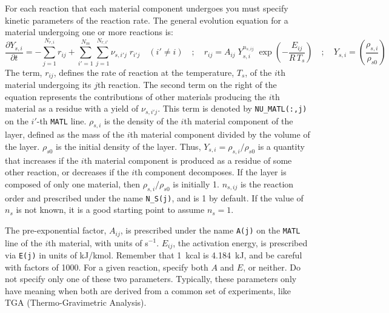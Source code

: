 \documentclass[11pt]{book}
\newcommand{\ct}{\tt\small}
\newcommand{\dod}[2]{\frac{\partial #1}{\partial #2}}
\newcommand{\be}{\begin{equation}}
\newcommand{\ee}{\end{equation}}
\begin{document}
For each reaction that each material component undergoes you must specify kinetic parameters of the reaction rate. The general evolution equation for
a material undergoing one or more reactions is:
\be
  \dod{Y_{s,i}}{t} = - \sum_{j=1}^{N_{r,i}} r_{ij} + \sum_{i'=1}^{N_m} \sum_{j=1}^{N_{r,i'}} \nu_{s,i'j} \; r_{i'j} \quad (i' \neq i)  \quad ; \quad
  r_{ij} = A_{ij} \; Y_{s,i}^{n_{s,ij}} \; \exp \left(-\frac{E_{ij}}{R \, T_s} \right) \quad ; \quad Y_{s,i} = \left( \frac{\rho_{s,i}}{\rho_{s0}} \right)
  \label{rr}
\ee
The term, $r_{ij}$, defines the rate of reaction at the temperature, $T_s$, of the $i$th material undergoing its $j$th reaction.
The second term on the right of the equation represents the contributions of other materials producing the $i$th material as a residue with a yield
of $\nu_{s,i'j}$. This term is denoted by {\ct NU\_MATL(:,j)} on the $i'$-th {\ct MATL} line.
$\rho_{s,i}$ is the density of the $i$th material component of the layer, defined as the mass of the $i$th material component
divided by the volume of the layer.  $\rho_{s0}$ is the initial
density of the layer. Thus, $Y_{s,i}=\rho_{s,i}/\rho_{s0}$ is a quantity that
increases if the $i$th material component is produced as a residue of some other
reaction, or decreases if the $i$th component decomposes.  If the
layer is composed of only one material, then $\rho_{s,i}/\rho_{s0}$ is initially 1.
$n_{s,ij}$ is the reaction order and prescribed under the name {\ct N\_S(j)}, and is 1 by default.
If the value of $n_s$ is not known, it is a good starting point to assume $n_s=1$.

The pre-exponential factor, $A_{ij}$, is prescribed under the name
{\ct A(j)} on the {\ct MATL} line of the $i$th material, with units of s$^{-1}$. $E_{ij}$, the activation energy,
is prescribed via {\ct E(j)} in units of kJ/kmol. Remember that 1~kcal
is 4.184~kJ, and be careful with factors of 1000. For a given reaction, specify both $A$ and $E$, or neither. Do not specify
only one of these two parameters. Typically, these parameters only have meaning when both are derived from a common set of
experiments, like TGA (Thermo-Gravimetric Analysis).
\end{document}
